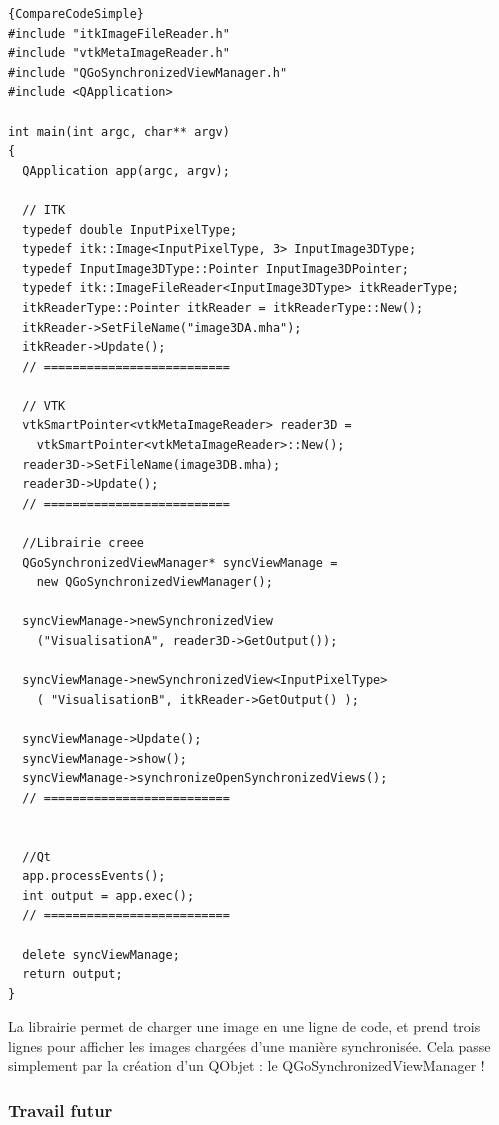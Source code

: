 \large
  \begin{lstlisting}[title={Utilisation simple de la librairie de comparaison d'images :\\Ce code permet d'ouvrir deux images : l'une provenant de la librairie ITK, et l'autre de VTK, et de synchroniser leur visualisation.}, label=SimpleCodeCompare]{CompareCodeSimple}
#include "itkImageFileReader.h"
#include "vtkMetaImageReader.h"
#include "QGoSynchronizedViewManager.h"
#include <QApplication>

int main(int argc, char** argv)
{
  QApplication app(argc, argv);

  // ITK
  typedef double InputPixelType;
  typedef itk::Image<InputPixelType, 3> InputImage3DType;
  typedef InputImage3DType::Pointer InputImage3DPointer;
  typedef itk::ImageFileReader<InputImage3DType> itkReaderType;
  itkReaderType::Pointer itkReader = itkReaderType::New();
  itkReader->SetFileName("image3DA.mha");
  itkReader->Update();
  // ==========================

  // VTK
  vtkSmartPointer<vtkMetaImageReader> reader3D = 
    vtkSmartPointer<vtkMetaImageReader>::New();
  reader3D->SetFileName(image3DB.mha);
  reader3D->Update();
  // ==========================

  //Librairie creee
  QGoSynchronizedViewManager* syncViewManage =
    new QGoSynchronizedViewManager();

  syncViewManage->newSynchronizedView
    ("VisualisationA", reader3D->GetOutput());

  syncViewManage->newSynchronizedView<InputPixelType>
    ( "VisualisationB", itkReader->GetOutput() );
    
  syncViewManage->Update();
  syncViewManage->show();
  syncViewManage->synchronizeOpenSynchronizedViews();
  // ==========================


  //Qt
  app.processEvents();
  int output = app.exec();
  // ==========================
  
  delete syncViewManage;
  return output;
}
  \end{lstlisting}
\normalsize
La librairie permet de charger une image en une ligne de code,
et prend trois lignes pour afficher les images chargées d'une manière synchronisée.
Cela passe simplement par la création d'un QObjet : le QGoSynchronizedViewManager !


\subsubsection*{Travail futur}

